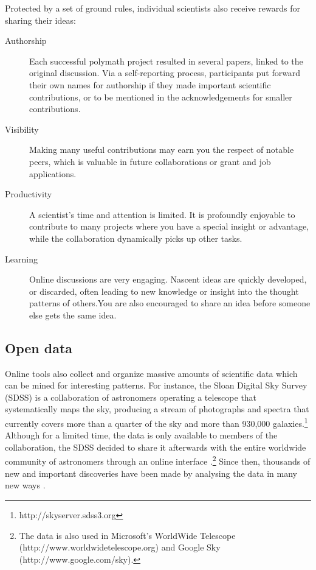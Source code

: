 \documentclass{acmproc-sp}
\begin{document}
Protected by a set of ground rules, individual scientists also receive rewards for sharing their ideas:

\begin{description}
\item[Authorship] Each successful polymath project resulted in several papers, linked to the original discussion. Via a self-reporting process, participants put forward their own names for authorship if they made important scientific contributions, or to be mentioned in the acknowledgements for smaller contributions.
\item[Visibility] Making many useful contributions may earn you the respect of notable peers, which is valuable in future collaborations or grant and job applications.
\item[Productivity] A scientist's time and attention is limited. It is profoundly enjoyable to contribute to many projects where you have a special insight or advantage, while the collaboration dynamically picks up other tasks.
\item[Learning] Online discussions are very engaging. Nascent ideas are quickly developed, or discarded, often leading to new knowledge or insight into the thought patterns of others.You are also encouraged to share an idea before someone else gets the same idea.
\end{description}


\subsection{Open data}
Online tools also collect and organize massive amounts of scientific data which can be mined for interesting patterns. For instance, the Sloan Digital Sky Survey (SDSS) is a collaboration of astronomers operating a telescope that systematically maps the sky, producing a stream of photographs and spectra that currently covers more than a quarter of the sky and more than 930,000 galaxies.\footnote{http://skyserver.sdss3.org} Although for a limited time, the data is only available to members of the collaboration, the SDSS decided to share it afterwards with the entire worldwide community of astronomers through an online interface \cite{szalay2002sdss}.\footnote{The data is also used in Microsoft's WorldWide Telescope (http://www.worldwidetelescope.org) and Google Sky (http://www.google.com/sky).} Since then, thousands of new and important discoveries have been made by analysing the data in many new ways \cite{boroson2009candidate}.
\end{document}
